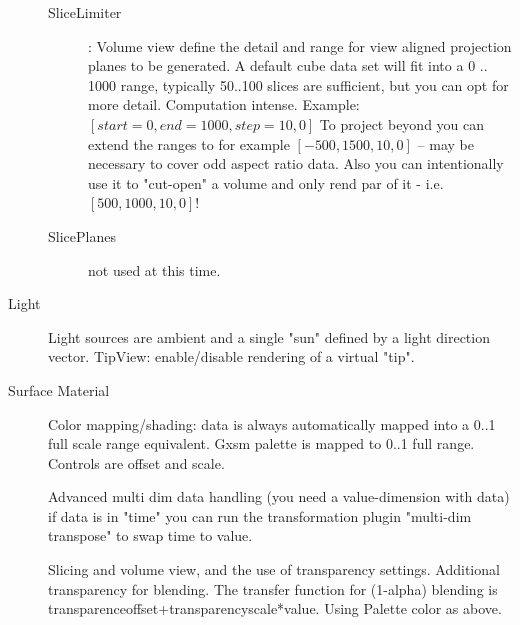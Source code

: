 \begin{description}
\begin{description}
			\item[SliceLimiter]: Volume view define the detail and range for view aligned projection planes to be generated. A default cube data set will fit into a 0 .. 1000 range, typically 50..100 slices are sufficient, but you can opt for more detail. Computation intense. Example: $[start = 0, end =1000, step = 10, 0]$ To project beyond you can extend the ranges to for example $[-500, 1500, 10, 0]$ -- may be necessary to cover odd aspect ratio data. Also you can intentionally use it to "cut-open" a volume and only rend par of it - i.e. $[500, 1000, 10, 0]$!
			\item[SlicePlanes] not used at this time.
	\end{description}
	\item[Light] Light sources are ambient and a single "sun" defined by a light direction vector.
	TipView: enable/disable rendering of a virtual "tip".
	
	\item[Surface Material] Color mapping/shading: data is always automatically mapped into a 0..1 full scale range equivalent.
		Gxsm palette is mapped to 0..1 full range. Controls are offset and scale.

		Advanced multi dim data handling (you need a value-dimension with data) if data is in "time" you can run the transformation plugin "multi-dim transpose" to swap time to value.
	
		Slicing and volume view, and the use of transparency settings. Additional transparency for blending. The transfer function for (1-alpha) blending is transparenceoffset+transparencyscale*value. Using Palette color as above.


\end{description}
